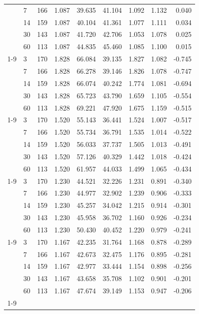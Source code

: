 \begin{table}[htbp]
\begin{tabular}{llrrrrrrr}
 & 7 & 166 & 1.087 & 39.635 & 41.104 & 1.092 & 1.132 & 0.040 \\
 & 14 & 159 & 1.087 & 40.104 & 41.361 & 1.077 & 1.111 & 0.034 \\
 & 30 & 143 & 1.087 & 41.720 & 42.706 & 1.053 & 1.078 & 0.025 \\
 & 60 & 113 & 1.087 & 44.835 & 45.460 & 1.085 & 1.100 & 0.015 \\
\cline{1-9}
\multirow[t]{5}{*}{LightGBM} & 3 & 170 & 1.828 & 66.084 & 39.135 & 1.827 & 1.082 & -0.745 \\
 & 7 & 166 & 1.828 & 66.278 & 39.146 & 1.826 & 1.078 & -0.747 \\
 & 14 & 159 & 1.828 & 66.074 & 40.242 & 1.774 & 1.081 & -0.694 \\
 & 30 & 143 & 1.828 & 65.723 & 43.790 & 1.659 & 1.105 & -0.554 \\
 & 60 & 113 & 1.828 & 69.221 & 47.920 & 1.675 & 1.159 & -0.515 \\
\cline{1-9}
\multirow[t]{5}{*}{LSTM} & 3 & 170 & 1.520 & 55.143 & 36.441 & 1.524 & 1.007 & -0.517 \\
 & 7 & 166 & 1.520 & 55.734 & 36.791 & 1.535 & 1.014 & -0.522 \\
 & 14 & 159 & 1.520 & 56.033 & 37.737 & 1.505 & 1.013 & -0.491 \\
 & 30 & 143 & 1.520 & 57.126 & 40.329 & 1.442 & 1.018 & -0.424 \\
 & 60 & 113 & 1.520 & 61.957 & 44.033 & 1.499 & 1.065 & -0.434 \\
\cline{1-9}
\multirow[t]{5}{*}{Ensemble (static)} & 3 & 170 & 1.230 & 44.521 & 32.226 & 1.231 & 0.891 & -0.340 \\
 & 7 & 166 & 1.230 & 44.977 & 32.902 & 1.239 & 0.906 & -0.333 \\
 & 14 & 159 & 1.230 & 45.257 & 34.042 & 1.215 & 0.914 & -0.301 \\
 & 30 & 143 & 1.230 & 45.958 & 36.702 & 1.160 & 0.926 & -0.234 \\
 & 60 & 113 & 1.230 & 50.430 & 40.452 & 1.220 & 0.979 & -0.241 \\
\cline{1-9}
\multirow[t]{5}{*}{Ensemble (regime-aware)} & 3 & 170 & 1.167 & 42.235 & 31.764 & 1.168 & 0.878 & -0.289 \\
 & 7 & 166 & 1.167 & 42.673 & 32.475 & 1.176 & 0.895 & -0.281 \\
 & 14 & 159 & 1.167 & 42.977 & 33.444 & 1.154 & 0.898 & -0.256 \\
 & 30 & 143 & 1.167 & 43.658 & 35.708 & 1.102 & 0.901 & -0.201 \\
 & 60 & 113 & 1.167 & 47.674 & 39.149 & 1.153 & 0.947 & -0.206 \\
\cline{1-9}
\bottomrule
\end{tabular}
\end{table}
